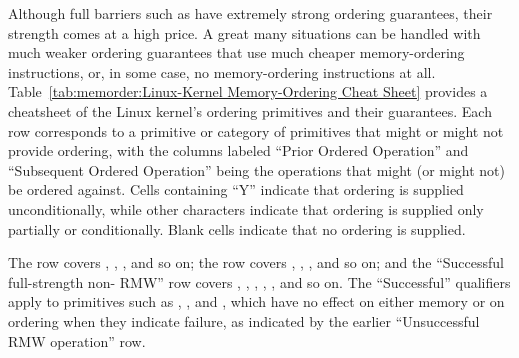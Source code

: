 \begin{table}[tbh]
\vspace{5pt}\hfill
{}\OneColumnHSpace{-0.9in}
\caption{Linux-Kernel Memory-Ordering Cheat Sheet}
\label{tab:memorder:Linux-Kernel Memory-Ordering Cheat Sheet}
\end{table}

Although full barriers such as  have extremely strong
ordering guarantees, their strength comes at a high price.
A great many situations can be handled with much weaker ordering guarantees
that use much cheaper memory-ordering instructions, or, in some case, no
memory-ordering instructions at all.
Table~\ref{tab:memorder:Linux-Kernel Memory-Ordering Cheat Sheet}
provides a cheatsheet of the Linux kernel's ordering primitives and their
guarantees.
Each row corresponds to a primitive or category of primitives that might
or might not provide ordering, with the columns labeled
``Prior Ordered Operation'' and ``Subsequent Ordered Operation''
being the operations that might (or might not) be ordered against.
Cells containing ``Y'' indicate that ordering is supplied unconditionally,
while other characters indicate that ordering is supplied only partially or
conditionally.
Blank cells indicate that no ordering is supplied.

The  row covers ,
, , and so on;
the  row covers ,
, , and so on; and
the ``Successful full-strength non- RMW'' row covers
, , ,
, , and so on.
The ``Successful'' qualifiers apply to primitives such as
, , and ,
which have no effect on either memory or on ordering when they indicate
failure, as indicated by the earlier ``Unsuccessful RMW operation'' row.

